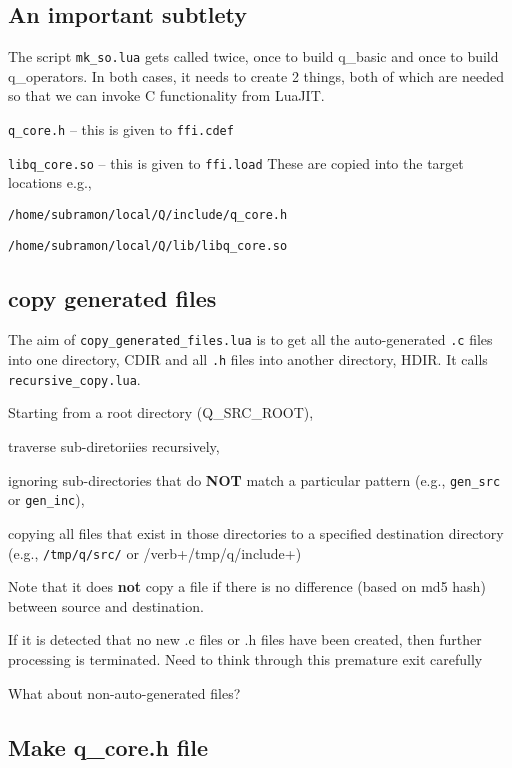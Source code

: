 \subsection{An important subtlety}

The script \verb+mk_so.lua+ gets called twice, 
once to build q\_basic and once to build q\_operators.
In both cases, it needs to create 2 things, both of which are needed so that we
can invoke C functionality from LuaJIT.
\be
\item \verb+q_core.h+ -- this is given to {\tt ffi.cdef}
\item \verb+libq_core.so+ -- this is given to {\tt ffi.load}
\ee
These are copied into the target locations e.g.,
\be
\item \verb+/home/subramon/local/Q/include/q_core.h+
\item \verb+/home/subramon/local/Q/lib/libq_core.so+
\ee

\subsection{copy generated files}
\label{copy_generated_files}

The aim of {\tt copy\_generated\_files.lua} is to get all the auto-generated 
{\tt .c} files into one directory, CDIR
and all {\tt .h} files into another directory, HDIR. It calls {\tt
recursive\_copy.lua}. 

\bi
\item Starting from a root directory (Q\_SRC\_ROOT), 
\item traverse sub-diretoriies recursively, 
\item ignoring sub-directories that do {\bf NOT} match a particular
pattern (e.g., \verb+gen_src+ or \verb+gen_inc+), 
\item copying all files that exist in
those directories to a specified destination directory (e.g., \verb+/tmp/q/src/+
or /verb+/tmp/q/include+)
\item Note that it does {\bf not} copy a file if there is no difference (based
on md5 hash) between source and destination.
\ei

If it is detected that no new .c files or .h files have been created, then
further processing is terminated. Need to think through this premature exit
carefully \TBC


What about non-auto-generated files? \TBC

\subsection{Make q\_core.h file}
\label{mk_q_core_h}

